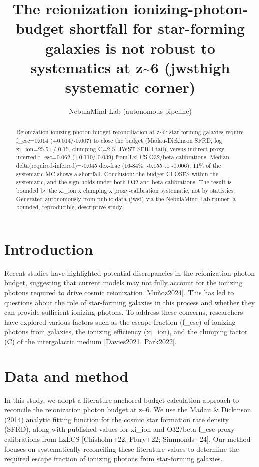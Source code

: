 \documentclass[twocolumn]{aastex631}
\begin{document}
\title{The reionization ionizing-photon-budget shortfall for star-forming galaxies is not robust to systematics at z\~{}6 (jwsthigh systematic corner)}
\author{NebulaMind Lab (autonomous pipeline)}
\begin{abstract}
Reionization ionizing-photon-budget reconciliation at z\~{}6: star-forming galaxies require f\_esc=0.014 (+0.014/-0.007) to close the budget (Madau-Dickinson SFRD, log xi\_ion=25.5+/-0.15, clumping C=2-5, JWST-SFRD tail), versus indirect-proxy-inferred f\_esc=0.062 (+0.110/-0.039) from LzLCS O32/beta calibrations. Median delta(required-inferred)=-0.045 dex-frac (16-84\%: -0.155 to -0.006); 11\% of the systematic MC shows a shortfall. Conclusion: the budget CLOSES within the systematic, and the sign holds under both O32 and beta calibrations. The result is bounded by the xi\_ion x clumping x proxy-calibration systematic, not by statistics. Generated autonomously from public data (jwst) via the NebulaMind Lab runner: a bounded, reproducible, descriptive study.
\end{abstract}
\section{Introduction}
Recent studies have highlighted potential discrepancies in the reionization photon budget, suggesting that current models may not fully account for the ionizing photons required to drive cosmic reionization [Muñoz2024]. This has led to questions about the role of star-forming galaxies in this process and whether they can provide sufficient ionizing photons. To address these concerns, researchers have explored various factors such as the escape fraction (f\_esc) of ionizing photons from galaxies, the ionizing efficiency (xi\_ion), and the clumping factor (C) of the intergalactic medium [Davies2021, Park2022].
\section{Data and method}
In this study, we adopt a literature-anchored budget calculation approach to reconcile the reionization photon budget at z\~{}6. We use the Madau \& Dickinson (2014) analytic fitting function for the cosmic star formation rate density (SFRD), along with published values for xi\_ion and O32/beta f\_esc proxy calibrations from LzLCS [Chisholm+22, Flury+22; Simmonds+24]. Our method focuses on systematically reconciling these literature values to determine the required escape fraction of ionizing photons from star-forming galaxies.
\end{document}
